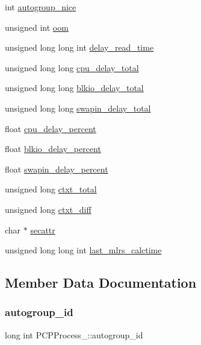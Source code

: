 \begin{DoxyCompactItemize}
\item 
int \hyperlink{structPCPProcess___a5a24116726a9a30ef14e6269db6dc7d5}{autogroup\+\_\+nice}
\item 
unsigned int \hyperlink{structPCPProcess___a4419acafcd5ae8b6f8b1c2d51463f51b}{oom}
\item 
unsigned long long int \hyperlink{structPCPProcess___a41014d15bb1b9fd41f22d81c186c17cf}{delay\+\_\+read\+\_\+time}
\item 
unsigned long long \hyperlink{structPCPProcess___aeaa612461ff4a013024fe65d5aa1e3b1}{cpu\+\_\+delay\+\_\+total}
\item 
unsigned long long \hyperlink{structPCPProcess___a221dac787718a536e9335c4019720d07}{blkio\+\_\+delay\+\_\+total}
\item 
unsigned long long \hyperlink{structPCPProcess___abebe6970e739d4ccacde3ef09315706f}{swapin\+\_\+delay\+\_\+total}
\item 
float \hyperlink{structPCPProcess___ae6f8fb1907d53206cdbb43e79b58e1a3}{cpu\+\_\+delay\+\_\+percent}
\item 
float \hyperlink{structPCPProcess___a06ff42e6906a3849259d9810eb5492ec}{blkio\+\_\+delay\+\_\+percent}
\item 
float \hyperlink{structPCPProcess___a1f2cbe836704194c9555511a1a07ba22}{swapin\+\_\+delay\+\_\+percent}
\item 
unsigned long \hyperlink{structPCPProcess___ace40f9e97d2802a545800da72f7dac45}{ctxt\+\_\+total}
\item 
unsigned long \hyperlink{structPCPProcess___a1c00b4fdacb89284555210edb7ea73b4}{ctxt\+\_\+diff}
\item 
char $\ast$ \hyperlink{structPCPProcess___a7da58a550cd96714773294fb5f06b83c}{secattr}
\item 
unsigned long long int \hyperlink{structPCPProcess___a322d911c8189bae7c6b832ffd0b93032}{last\+\_\+mlrs\+\_\+calctime}
\end{DoxyCompactItemize}


\subsection{Member Data Documentation}
\mbox{\label{structPCPProcess___a6577ca9e89f6097c32f4b43317d0ac93}} 
\subsubsection{\texorpdfstring{autogroup\+\_\+id}{autogroup\_id}}
{\footnotesize\ttfamily long int P\+C\+P\+Process\+\_\+\+::autogroup\+\_\+id}

